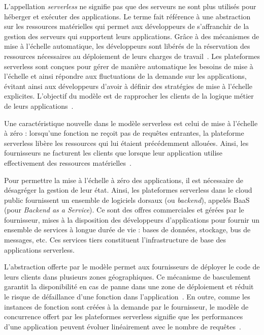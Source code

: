 L'appellation \textit{serverless} ne signifie pas que des serveurs ne sont plus utilisés pour héberger et exécuter des applications. Le terme fait référence à une abstraction sur les ressources matérielles qui permet aux développeurs de s'affranchir de la gestion des serveurs qui supportent leurs applications. Grâce à des mécanismes de mise à l'échelle automatique, les développeurs sont libérés de la réservation des ressources nécessaires au déploiement de leurs charges de travail~\cite{vaneykSPECRGCloud2018}. Les plateformes serverless sont conçues pour gérer de manière automatique les besoins de mise à l'échelle et ainsi répondre aux fluctuations de la demande sur les applications, évitant ainsi aux développeurs d'avoir à définir des stratégies de mise à l'échelle explicites. L'objectif du modèle est de rapprocher les clients de la logique métier de leurs applications~\cite{vaneykSPECRGReferenceArchitecture2019}.

Une caractéristique nouvelle dans le modèle serverless est celui de mise à l'échelle à zéro : lorsqu'une fonction ne reçoit pas de requêtes entrantes, la plateforme serverless libère les ressources qui lui étaient précédemment allouées. Ainsi, les fournisseurs ne facturent les clients que lorsque leur application utilise effectivement des ressources matérielles~\cite{hellersteinServerlessComputingOne2019}.

Pour permettre la mise à l'échelle à zéro des applications, il est nécessaire de désagréger la gestion de leur état. Ainsi, les plateformes serverless dans le cloud public fournissent un ensemble de logiciels dorsaux (ou \textit{backend}), appelés \gls{BaaS}~\cite{mikeroberts2018serverless} (pour \textit{Backend as a Service}). Ce sont des offres commerciales et gérées par le fournisseur, mises à la disposition des développeurs d'applications pour fournir un ensemble de services à longue durée de vie : bases de données, stockage, bus de messages, etc. Ces services tiers constituent l'infrastructure de base des applications serverless.

L'abstraction offerte par le modèle permet aux fournisseurs de déployer le code de leurs clients dans plusieurs zones géographiques. Ce mécanisme de basculement garantit la disponibilité en cas de panne dans une zone de déploiement et réduit le risque de défaillance d'une fonction dans l'application~\cite{taibiPatternsServerlessFunctions2020}. En outre, comme les instances de fonction sont créées à la demande par le fournisseur, le modèle de concurrence offert par les plateformes serverless signifie que les performances d'une application peuvent évoluer linéairement avec le nombre de requêtes~\cite{mcgrathServerlessComputingDesign2017}.

